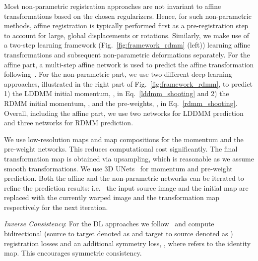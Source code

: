 \documentclass{article}
\numberwithin{equation}{section}
\newcommand{\ie}{{i.e.}}
\newcommand{\zy}[1]{{\color{black}{#1}}}
\begin{document}
Most non-parametric registration approaches are not invariant to affine transformations based on the chosen regularizers. Hence, for such non-parametric methods, affine registration is typically performed first as a pre-registration step to account for large, global displacements or rotations. Similarly, we make use of a two-step learning framework (Fig.~\ref{fig:framework_rdmm} (left)) learning affine transformations and subsequent non-parametric deformations separately. For the affine part, a multi-step affine network is used to predict the affine transformation following~\citep{shen2019networks}. For the non-parametric part, we use two different deep learning approaches, illustrated in the right part of Fig.~\ref{fig:framework_rdmm}, to predict 1) the LDDMM initial momentum, , in Eq.~\eqref{lddmm_shooting} and 2) the RDMM initial momentum, , and the pre-weights, , in Eq.~\eqref{rdmm_shooting}. Overall, including the affine part, we use two networks for LDDMM prediction and three networks for RDMM prediction.







We use low-resolution maps and map compositions for the momentum and the pre-weight networks. This reduces computational cost significantly. The final transformation map is obtained via upsampling, which is reasonable as we assume smooth transformations. We use 3D UNets~\citep{cciccek2016_3d_unet} for momentum and pre-weight prediction. Both the affine and the non-parametric networks can be iterated to refine the prediction results: \ie~ the input source image and the initial map are replaced with the currently warped image and the transformation map respectively for the next iteration.

\zy{During training of the non-parametric part, the gradient is first backpropagated through the differentiable interpolation operator, then through the LDDMM/RDMM unit, followed by the momentum generation network and the pre-weight network.}

{\it Inverse Consistency}: For the DL approaches we follow~\cite{shen2019networks} and compute bidirectional (source to target denoted as  and target to source denoted as ) registration losses and an additional symmetry loss, , where  refers to the identity map. This encourages symmetric consistency. 
\end{document}
